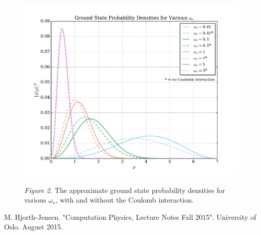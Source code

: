 \documentclass[prb,aps,twocolumn,showpacs,10pt]{revtex4-1}
\begin{document}
\begin{center}
\begin{figure}
\includegraphics[scale=0.7]{prob_dens_2e.pdf}

\textit{Figure 2.} The approximate ground state probability densities for various $\omega_r$, with and without the Coulomb interaction. 
\end{figure}
\end{center} 




\newpage 
\begin{references}
 M. Hjorth-Jensen. "Computation Physics, Lecture Notes Fall 2015". University of Oslo. August 2015.
\end{references}
\end{document}
